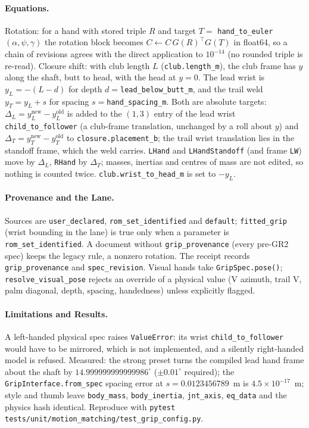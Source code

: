 \documentclass[11pt,a4paper]{article}
\begin{document}
\paragraph{Equations.}
Rotation: for a hand with stored triple $R$ and target $T=$
\texttt{hand\_to\_euler}$(\alpha,\psi,\gamma)$ the rotation block becomes
$C\leftarrow C\,G(R)^{\top}G(T)$ in float64, so a chain of revisions agrees
with the direct application to $10^{-14}$ (no rounded triple is re-read).
Closure shift: with club length $L$ (\texttt{club.length\_m}), the club frame
has $y$ along the shaft, butt to head, with the head at $y=0$. The lead wrist is
$y_L=-(L-d)$ for depth $d=$\texttt{lead\_below\_butt\_m}, and the trail weld
$y_T=y_L+s$ for spacing $s=$\texttt{hand\_spacing\_m}. Both are absolute
targets: $\Delta_L=y_L^{\mathrm{new}}-y_L^{\mathrm{old}}$ is added to the $(1,3)$
entry of the lead wrist \texttt{child\_to\_follower} (a club-frame translation,
unchanged by a roll about $y$) and $\Delta_T=y_T^{\mathrm{new}}-y_T^{\mathrm{old}}$
to \texttt{closure.placement\_b}; the trail wrist translation lies in the
standoff frame, which the weld carries. \texttt{LHand} and
\texttt{LHandStandoff} (and frame \texttt{LW}) move by $\Delta_L$, \texttt{RHand}
by $\Delta_T$; masses, inertias and centres of mass are not edited, so nothing is
counted twice. \texttt{club.wrist\_to\_head\_m} is set to $-y_L$.

\paragraph{Provenance and the Lane.}
Sources are \texttt{user\_declared}, \texttt{rom\_set\_identified} and
\texttt{default}; \texttt{fitted\_grip} (wrist bounding in the lane) is true only
when a parameter is \texttt{rom\_set\_identified}. A document without
\texttt{grip\_provenance} (every pre-GR2 spec) keeps the legacy rule, a nonzero
rotation. The receipt records \texttt{grip\_provenance} and \texttt{spec\_revision}.
Visual hands take \texttt{GripSpec.pose()}; \texttt{resolve\_visual\_pose}
rejects an override of a physical value (V azimuth, trail V, palm diagonal,
depth, spacing, handedness) unless explicitly flagged.

\paragraph{Limitations and Results.}
A left-handed physical spec raises \texttt{ValueError}: its wrist
\texttt{child\_to\_follower} would have to be mirrored, which is not implemented,
and a silently right-handed model is refused. Measured: the strong preset turns
the compiled lead hand frame about the shaft by $14.999999999999986^\circ$
($\pm0.01^\circ$ required); the \texttt{GripInterface.from\_spec} spacing error
at $s=0.0123456789$~m is $4.5\times10^{-17}$~m; style and thumb leave
\texttt{body\_mass}, \texttt{body\_inertia}, \texttt{jnt\_axis}, \texttt{eq\_data}
and the physics hash identical. Reproduce with
\texttt{pytest tests/unit/motion\_matching/test\_grip\_config.py}.
\end{document}
